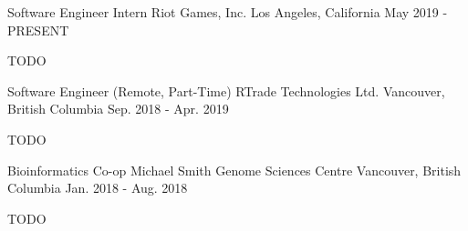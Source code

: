 

\begin{cventries}

  \cventry
    {Software Engineer Intern} %
    {Riot Games, Inc.} %
    {Los Angeles, California} %
    {May 2019 - PRESENT} %
    {
      \begin{cvitems} %
        \item {TODO}
      \end{cvitems}
    }

  \cventry
    {Software Engineer (Remote, Part-Time)} %
    {RTrade Technologies Ltd.} %
    {Vancouver, British Columbia} %
    {Sep. 2018 - Apr. 2019} %
    {
      \begin{cvitems} %
        \item {TODO}
      \end{cvitems}
    }

  \cventry
    {Bioinformatics Co-op} %
    {Michael Smith Genome Sciences Centre} %
    {Vancouver, British Columbia} %
    {Jan. 2018 - Aug. 2018} %
    {
      \begin{cvitems} %
        \item {TODO}
      \end{cvitems}
    }

\end{cventries}

